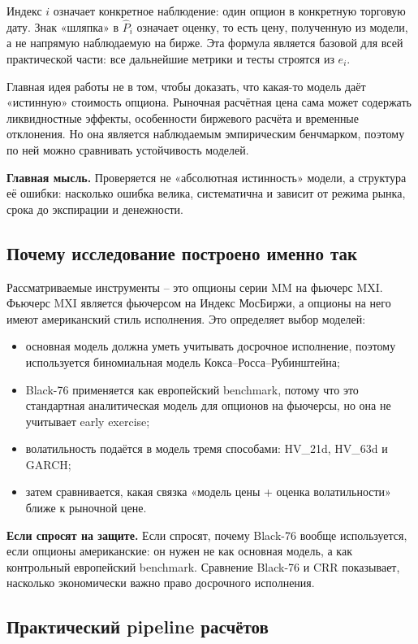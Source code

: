 \documentclass[11pt,a4paper]{article}
\newcommand{\key}[1]{%
  \vspace{0.15em}
  \noindent\colorbox{softblue}{%
    \parbox{\dimexpr\linewidth-2\fboxsep\relax}{\textbf{Главная мысль.} #1}%
  }\vspace{0.2em}
}
\newcommand{\answer}[1]{%
  \vspace{0.15em}
  \noindent\colorbox{softgreen}{%
    \parbox{\dimexpr\linewidth-2\fboxsep\relax}{\textbf{Если спросят на защите.} #1}%
  }\vspace{0.2em}
}
\begin{document}
Индекс $i$ означает конкретное наблюдение: один опцион в конкретную торговую дату. Знак «шляпка» в $\widehat{P}_i$ означает оценку, то есть цену, полученную из модели, а не напрямую наблюдаемую на бирже. Эта формула является базовой для всей практической части: все дальнейшие метрики и тесты строятся из $e_i$.

Главная идея работы не в том, чтобы доказать, что какая-то модель даёт «истинную» стоимость опциона. Рыночная расчётная цена сама может содержать ликвидностные эффекты, особенности биржевого расчёта и временные отклонения. Но она является наблюдаемым эмпирическим бенчмарком, поэтому по ней можно сравнивать устойчивость моделей.

\key{Проверяется не «абсолютная истинность» модели, а структура её ошибки: насколько ошибка велика, систематична и зависит от режима рынка, срока до экспирации и денежности.}

\subsection{Почему исследование построено именно так}

Рассматриваемые инструменты -- это опционы серии MM на фьючерс MXI. Фьючерс MXI является фьючерсом на Индекс МосБиржи, а опционы на него имеют американский стиль исполнения. Это определяет выбор моделей:

\begin{itemize}
    \item основная модель должна уметь учитывать досрочное исполнение, поэтому используется биномиальная модель Кокса--Росса--Рубинштейна;
    \item Black-76 применяется как европейский benchmark, потому что это стандартная аналитическая модель для опционов на фьючерсы, но она не учитывает early exercise;
    \item волатильность подаётся в модель тремя способами: HV\_21d, HV\_63d и GARCH;
    \item затем сравнивается, какая связка «модель цены + оценка волатильности» ближе к рыночной цене.
\end{itemize}

\answer{Если спросят, почему Black-76 вообще используется, если опционы американские: он нужен не как основная модель, а как контрольный европейский benchmark. Сравнение Black-76 и CRR показывает, насколько экономически важно право досрочного исполнения.}

\subsection{Практический pipeline расчётов}
\end{document}
